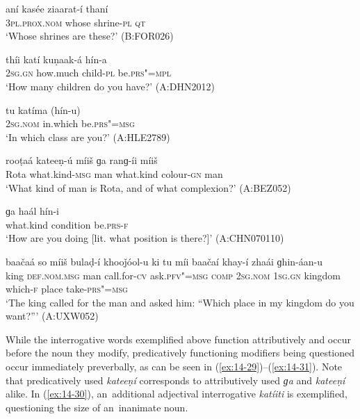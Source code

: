 \begin{exe}
\ex
\label{ex:14-23}
\gll aní kasée ziaarat-í thaní \\
\textsc{3pl.prox.nom} whose shrine-\textsc{pl} \textsc{qt} \\
\glt `Whose shrines are these?' (B:FOR026)

\ex
\label{ex:14-24}
\gll thíi katí kuṇaak-á hín-a \\
\textsc{2sg.gn} how.much child-\textsc{pl} be.\textsc{prs"=mpl} \\
\glt `How many children do you have?' (A:DHN2012)

\ex
\label{ex:14-25}
\gll tu katíma (hín-u) \\
\textsc{2sg.nom} in.which be.\textsc{prs"=msg} \\
\glt `In which class are you?' (A:HLE2789)

\ex
\label{ex:14-26}
\gll rooṭaá kateeṇ-ú míiš ɡa ranɡ-íi  míiš \\
Rota what.kind-\textsc{msg} man what.kind colour-\textsc{gn} man  \\
\glt `What kind of man is Rota, and of what complexion?' (A:BEZ052)

\ex
\label{ex:14-27}
\gll ɡa haál hín-i \\
what.kind condition be.\textsc{prs-f} \\
\glt `How are you doing [lit. what position is there?]' (A:CHN070110)

\ex
\label{ex:14-28}
\gll baačaá so míiš bulaḍ-í khooǰóol-u  ki tu míi baačaí khay-í zhaái ɡhin-áan-u \\
king \textsc{def.nom.msg} man call.for-\textsc{cv} ask.\textsc{pfv"=msg} \textsc{comp} \textsc{2sg.nom} \textsc{1sg.gn} kingdom which-\textsc{f} place take-\textsc{prs"=msg}  \\
\glt `The king called for the man and asked him: ``Which place in my kingdom do you want?''' (A:UXW052)
\end{exe}

While the interrogative words exemplified above function attributively and occur before the noun they modify, predicatively functioning modifiers being questioned occur immediately preverbally, as can be seen in (\ref{ex:14-29})--(\ref{ex:14-31}). Note that predicatively used \textit{kateeṇí} corresponds to attributively used \textit{ɡa} and \textit{kateeṇí} alike. In (\ref{ex:14-30}), an~additional adjectival interrogative \textit{katíiti} is exemplified, questioning the size of an~inanimate noun.

